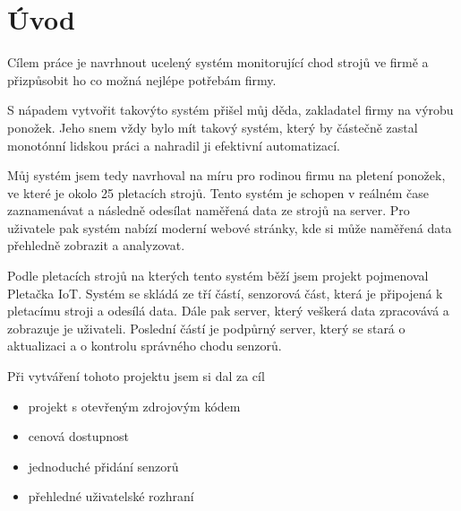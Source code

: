 \chapter*{Úvod}


Cílem práce je navrhnout ucelený systém monitorující chod strojů ve firmě a přizpůsobit ho co možná nejlépe potřebám firmy.

S nápadem vytvořit takovýto systém přišel můj děda, zakladatel firmy na výrobu ponožek.
Jeho snem vždy bylo mít takový systém, který by částečně zastal monotónní lidskou práci a nahradil ji efektivní automatizací.

Můj systém jsem tedy navrhoval na míru pro rodinou firmu na pletení ponožek, ve které je okolo 25 pletacích strojů. 
Tento systém je schopen v reálném čase zaznamenávat a následně odesílat naměřená data ze strojů na server. 
Pro uživatele pak systém nabízí moderní webové stránky, kde si může naměřená data přehledně zobrazit a analyzovat.

Podle pletacích strojů na kterých tento systém běží jsem projekt pojmenoval Pletačka IoT. 
Systém se skládá ze tří částí, senzorová část, která je připojená k pletacímu stroji a odesílá data.
Dále pak server, který veškerá data zpracovává a zobrazuje je uživateli.
Poslední částí je podpůrný server, který se stará o aktualizaci a o kontrolu správného chodu senzorů.\newline



Při vytváření tohoto projektu jsem si dal za cíl
\begin{itemize}
    \item projekt s otevřeným zdrojovým kódem
    \item cenová dostupnost
    \item jednoduché přidání senzorů
    \item přehledné uživatelské rozhraní
\end{itemize}

\newpage
